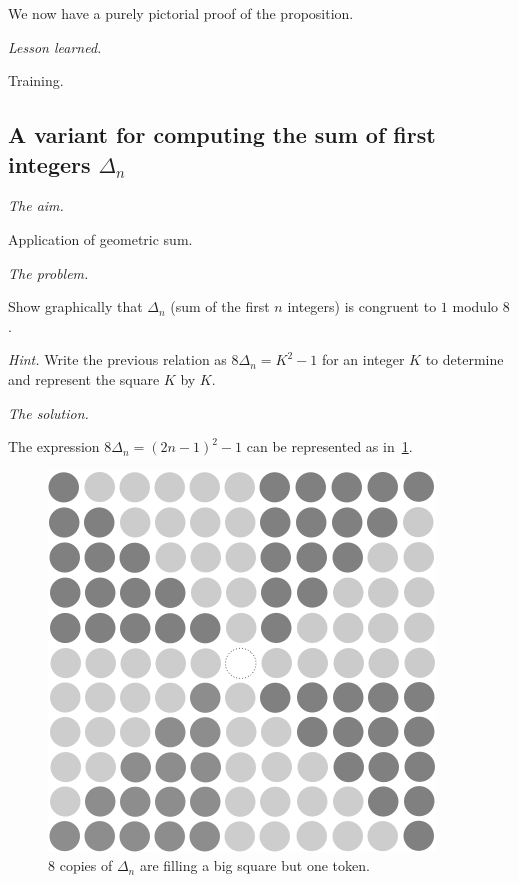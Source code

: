 We now have a purely pictorial proof of the proposition. 
\medskip

\noindent \textit{Lesson learned.}

Training.


\subsection{A variant for computing the sum of first integers $\Delta_n$}

\noindent \textit{The aim.}

Application of geometric sum.
\medskip

\noindent \textit{The problem.}

Show graphically that $\Delta_n$ (sum of the first $n$ integers) is congruent to $1$ modulo $8$.
\medskip

\noindent \textit{Hint.}
Write the previous relation as $8 \Delta_n = K^2 -1$
for an integer $K$ to determine and represent the square $K$ by $K$. 

\noindent \textit{The solution.}

The expression $8 \Delta_n = (2n-1)^2 -1$ can be represented as in~\ref{fig:Sum8deltas}.
\begin{figure}[ht]
\begin{center}
       \includegraphics[scale=0.4]{FiguresMaths/Delta8}
\caption{8 copies of $\Delta_n$ are filling a big square but one token.}
       \label{fig:Sum8deltas}
\end{center}
\end{figure}



